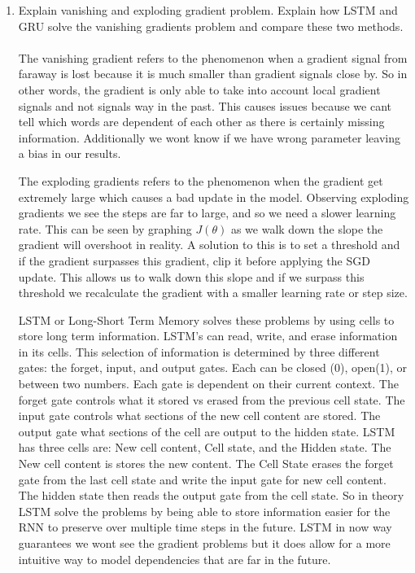 \documentclass[12pt]{article}
\begin{document}
\begin{enumerate}
	\item Explain vanishing and exploding gradient problem. Explain how LSTM and GRU solve the vanishing gradients problem and compare these two methods.\\\\ 
    The vanishing gradient refers to the phenomenon when a gradient signal from faraway is lost because it is much smaller than gradient signals close by. So in other words, the gradient is only able to take into account local gradient signals and not signals way in the past. This causes issues because we cant tell which words are dependent of each other as there is certainly missing information. Additionally we wont know if we have wrong parameter leaving a bias in our results. 
    
    The exploding gradients refers to the phenomenon when the gradient get extremely large which causes a bad update in the model. Observing exploding gradients we see the steps are far to large, and so we need a slower learning rate. This can be seen by graphing $J(\theta)$ as we walk down the slope the gradient will overshoot in reality. A solution to this is to set a threshold and if the gradient surpasses this gradient, clip it before applying the SGD update. This allows us to walk down this slope and if we surpass this threshold we recalculate the gradient with a smaller learning rate or step size. 
    
    LSTM or Long-Short Term Memory solves these problems by using cells to store long term information. LSTM's can read, write, and erase information in its cells. This selection of information is determined by three different gates: the forget, input, and output gates. Each can be closed (0), open(1), or between two numbers. Each gate is dependent on their current context. The forget gate controls what it stored vs erased from the previous cell state. The input gate controls what sections of the new cell content are stored. The output gate what sections of the cell are output to the hidden state. LSTM has three cells are: New cell content, Cell state, and the Hidden state. The New cell content is stores the new content. The Cell State erases the forget gate from the last cell state and write the input gate for new cell content. The hidden state then reads the output gate from the cell state.  So in theory LSTM solve the problems by being able to store information easier for the RNN to preserve over multiple time steps in the future. LSTM in now way guarantees we wont see the gradient problems but it does allow for a more intuitive way to model dependencies that are far in the future. 
    

\end{enumerate}
\end{document}
